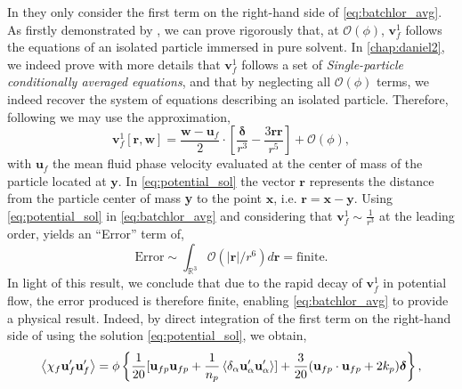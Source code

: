 In \citet{van1998pseudo} they only consider the first term on the right-hand side of \ref{eq:batchlor_avg}. 
As firstly demonstrated by \citet{hinch1977averaged}, we can prove rigorously that, at $\mathcal{O}(\phi)$, $\textbf{v}_f^1$ follows the equations of an isolated particle immersed in pure solvent. 
In \ref{chap:daniel2}, we indeed prove with more details that $\textbf{v}_f^{1}$ follows a set of \textit{Single-particle conditionally averaged equations}, and that by neglecting all $\mathcal{O}(\phi)$ terms, we indeed recover the system of equations describing an isolated particle. 
Therefore, following \citet{van1998pseudo,zhang1994averaged} we may use the approximation, 
\begin{equation}
    \textbf{v}_f^{1}[\textbf{r},\textbf{w}]
    = 
    \frac{\textbf{w} - \textbf{u}_f}{2}\cdot \left[
        \frac{\bm\delta}{r^3}-\frac{3\textbf{rr}}{r^5}
    \right]
    + \mathcal{O}(\phi),
    \label{eq:potential_sol}
\end{equation}
with $\textbf{u}_f$ the mean fluid phase velocity evaluated at the center of mass of the particle located at $\textbf{y}$. 
In \ref{eq:potential_sol} the vector $\textbf{r}$ represents the distance from the particle center of mass \textbf{y} to the point $\textbf{x}$, i.e. $\textbf{r} = \textbf{x} - \textbf{y}$. 
Using \ref{eq:potential_sol} in \ref{eq:batchlor_avg} and considering that $\textbf{v}_f^{1}\sim \frac{1}{r^3}$ at the leading order, yields an ``Error'' term of,  
\begin{equation*}
    \text{Error}
    \sim
    \int_{\mathbb{R}^3}
    \mathcal{O}(|\textbf{r}|/r^6)
    d\textbf{r}
    = \text{finite}. 
\end{equation*}
In light of this result, we conclude that due to the rapid decay of $\textbf{v}_f^{1}$ in potential flow, the error produced is therefore finite, enabling \ref{eq:batchlor_avg} to provide a physical result.
Indeed, by direct integration of the first term on the right-hand side of \citet{eq:batchlor_avg} using the solution \ref{eq:potential_sol}, we obtain, 
\begin{equation}
    \avg{\chi_f \textbf{u}_f'\textbf{u}_f'}
    = \phi \left\{
        \frac{1}{20}[\textbf{u}_{fp}\textbf{u}_{fp}+ \frac{1}{n_p}\pavg{\textbf{u}_\alpha'\textbf{u}_\alpha'}]
        + 
        \frac{3}{20} (\textbf{u}_{fp}\cdot \textbf{u}_{fp} + 2k_p)\bm\delta
    \right\},
    \label{eq:van_wingarden_sol}
\end{equation} 
